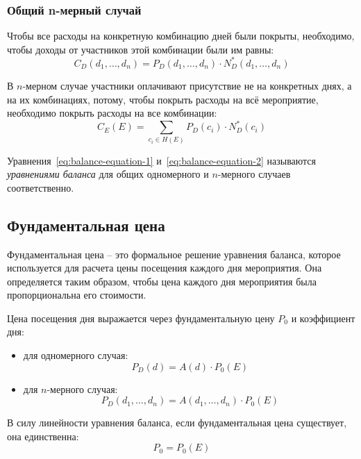 \subsubsection{Общий n-мерный случай}

Чтобы все расходы на конкретную комбинацию дней были покрыты, необходимо, чтобы доходы от участников этой комбинации были им равны:
\begin{equation}
	C_D(d_1, \dots, d_n) = P_D(d_1, \dots, d_n) \cdot N_D^*(d_1, \dots, d_n)
	\label{eq:cost-price-2}
\end{equation}

В $n$-мерном случае участники оплачивают присутствие не на конкретных днях, а на их комбинациях, потому, чтобы покрыть расходы на всё мероприятие, необходимо покрыть расходы на все комбинации:
\begin{equation}
	C_E(E) = \sum_{c_i \in H(E)}{P_D(c_i) \cdot N_D^*(c_i)}
	\label{eq:balance-equation-2}
\end{equation}

Уравнения~\ref{eq:balance-equation-1} и~\ref{eq:balance-equation-2} называются \textit{уравнениями баланса} для общих одномерного и $n$-мерного случаев соответственно.

\subsection{Фундаментальная цена}

Фундаментальная цена -- это формальное решение уравнения баланса, которое используется для расчета цены посещения каждого дня мероприятия. Она определяется таким образом, чтобы цена каждого дня мероприятия была пропорциональна его стоимости.

Цена посещения дня выражается через фундаментальную цену $P_0$ и коэффициент дня:
\begin{itemize}[label=--]
	\item для одномерного случая:
	\begin{equation}
		P_D(d) = A(d) \cdot P_0(E)
		\label{eq:price-by-fundamental-price-1}
	\end{equation}
	\item для $n$-мерного случая:
	\begin{equation}
		P_D(d_1, \dots, d_n) = A(d_1, \dots, d_n) \cdot P_0(E)
		\label{eq:price-by-fundamental-price-2}
	\end{equation}
\end{itemize}  

В силу линейности уравнения баланса, если фундаментальная цена существует, она единственна:
\begin{equation}
	P_0 = P_0(E)
\end{equation}

